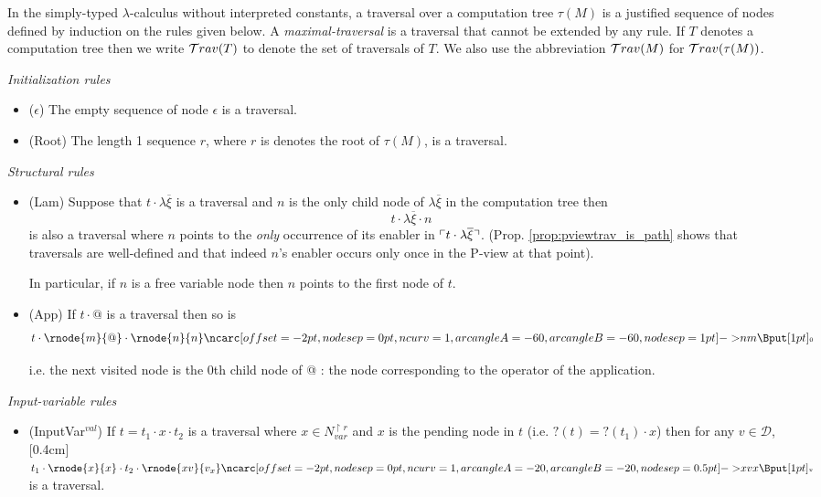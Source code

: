 \begin{dfn}
\label{def:traversal}
In the simply-typed $\lambda$-calculus without interpreted constants, a traversal over a computation tree $\tau(M)$ is a justified sequence of nodes defined by induction on the rules
given below. A \emph{maximal-traversal} is a traversal that cannot be
extended by any rule. If $T$ denotes a computation tree then we write $\mathcal{T}rav(T)$
to denote the set of traversals of $T$. We also use the abbreviation $\mathcal{T}rav(M)$ for $\mathcal{T}rav(\tau(M))$.

\emph{Initialization rules}
\begin{itemize}
\item ($\epsilon$) The empty sequence of node $\epsilon$ is a traversal.
\item (Root) The length 1 sequence $r$, where $r$ is denotes the root of $\tau(M)$, is a traversal.
\end{itemize}

\emph{Structural rules}
\begin{itemize}
\item (Lam) Suppose that $t \cdot \lambda \overline{\xi}$ is a traversal and $n$ is the only child node of $\lambda \overline{\xi}$ in
the computation tree then
$$t \cdot \lambda \overline{\xi} \cdot n$$
is also a traversal
where $n$ points to the \emph{only} occurrence of its enabler in $\ulcorner t \cdot \lambda \overline{\xi} \urcorner$.
(Prop. \ref{prop:pviewtrav_is_path} shows that traversals are well-defined and that indeed $n$'s enabler occurs only once in the P-view at that point).

In particular, if $n$ is a free variable node then $n$ points to the first node of $t$.

\item (App) If $t \cdot @$ is a traversal then so is
$$t \cdot \rnode{m}{@} \cdot
\rnode{n}{n} \link[nodesep=1pt]{60}{n}{m} \lnklabelc{0}
$$

i.e. the next visited node is the $0$th child node of @ : the
node corresponding to the operator of the application.
\end{itemize}

\emph{Input-variable rules}
\begin{itemize}
\item (InputVar$^{val}$) If $t = t_1 \cdot x \cdot t_2$ is a traversal where $x \in N^{\upharpoonright r}_{var}$ and $x$ is the pending node in $t$ (i.e. $?(t)=?(t_1) \cdot x$) then for any $v \in \mathcal{D}$,
\raisebox{0cm}[0.4cm]{$t_1 \cdot \rnode{x}{x} \cdot t_2 \cdot \rnode{xv}{v_x}
\link[nodesep=0.5pt]{20}{xv}{x} \lnklabelc{v}$} is a traversal.



\end{itemize}
\end{dfn}
